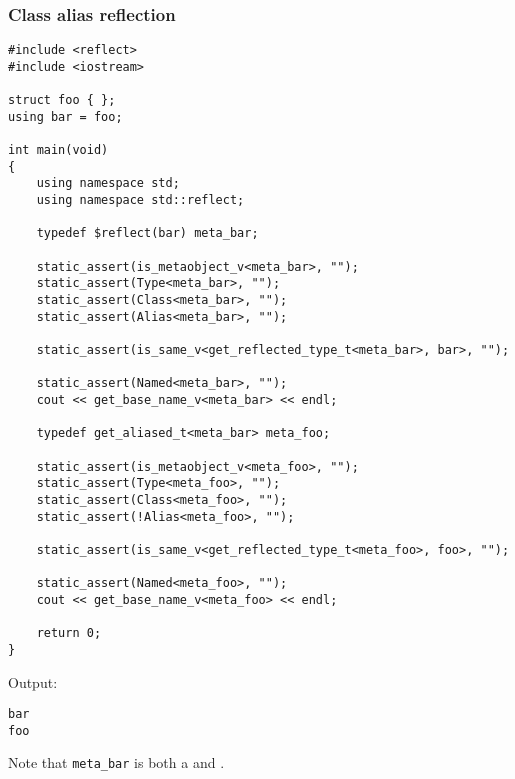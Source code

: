 \subsubsection{Class alias reflection}

\begin{verbatim}
#include <reflect>
#include <iostream>

struct foo { };
using bar = foo;

int main(void)
{
	using namespace std;
	using namespace std::reflect;

	typedef $reflect(bar) meta_bar;

	static_assert(is_metaobject_v<meta_bar>, "");
	static_assert(Type<meta_bar>, "");
	static_assert(Class<meta_bar>, "");
	static_assert(Alias<meta_bar>, "");

	static_assert(is_same_v<get_reflected_type_t<meta_bar>, bar>, "");

	static_assert(Named<meta_bar>, "");
	cout << get_base_name_v<meta_bar> << endl;

	typedef get_aliased_t<meta_bar> meta_foo;

	static_assert(is_metaobject_v<meta_foo>, "");
	static_assert(Type<meta_foo>, "");
	static_assert(Class<meta_foo>, "");
	static_assert(!Alias<meta_foo>, "");

	static_assert(is_same_v<get_reflected_type_t<meta_foo>, foo>, "");

	static_assert(Named<meta_foo>, "");
	cout << get_base_name_v<meta_foo> << endl;

	return 0;
}
\end{verbatim}

Output:

\begin{verbatim}
bar
foo
\end{verbatim}

Note that \texttt{meta\_bar} is both a  and .

